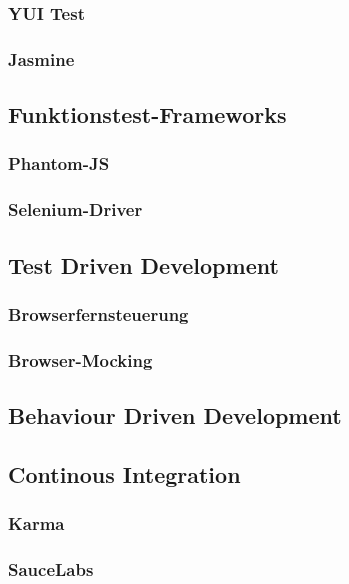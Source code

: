 \subsubsection{YUI Test}

\subsubsection{Jasmine}

\subsection{Funktionstest-Frameworks}

\subsubsection{Phantom-JS}

\subsubsection{Selenium-Driver}

\subsection{Test Driven Development}

\subsubsection{Browserfernsteuerung}

\subsubsection{Browser-Mocking}

\subsection{Behaviour Driven Development}

\subsection{Continous Integration}

\subsubsection{Karma}

\subsubsection{SauceLabs}

